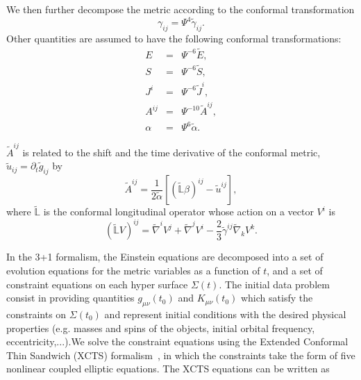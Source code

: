 \documentclass[aps,prd,amsmath,floatfix
,twocolumn
,superscriptaddress,nofootinbib,showpacs]{revtex4-1}
\theoremstyle{plain} \newtheorem{thm}{Theorem} \newtheorem{lem}{Lemma}
\begin{document}
We then further decompose the metric according to the conformal
transformation
\begin{equation}
\gamma_{ij} = \Psi^4\tilde{\gamma}_{ij}.
\end{equation}
Other quantities are assumed to have the following conformal
transformations:
\begin{eqnarray}
E &=& \Psi^{-6}\tilde{E}, \\ S &=& \Psi^{-6}\tilde{S}, \\ J^{i} &=&
\Psi^{-6}\tilde{J}^i, \\ A^{ij} &=& \Psi^{-10}\tilde{A}^{ij},\\ \alpha
&=& \Psi^{6}\tilde{\alpha}.
\end{eqnarray}

$\tilde{A}^{ij}$ is related to the shift and the time derivative of the conformal
metric, $\tilde{u}_{ij}=\partial_t\tilde{g}_{ij}$ by
\begin{equation}
\tilde{A}^{ij} =
\frac{1}{2\tilde{\alpha}}\left[\left(\tilde{\mathbb{L}}\beta\right)^{ij}-\tilde{u}^{ij}\right],
\end{equation}
where $\tilde{\mathbb{L}}$ is the conformal longitudinal operator whose action on a vector $V^i$ is
\begin{equation}
\left(\tilde{\mathbb{L}}V\right)^{ij} = \tilde{\nabla}^iV^j +
\tilde{\nabla}^jV^i -
\frac{2}{3}\tilde{\gamma}^{ij}\tilde{\nabla}_kV^k.
\end{equation}

In the 3+1 formalism, the Einstein equations are decomposed into a set
of evolution equations for the metric variables as a function of $t$,
and a set of constraint equations on each hyper surface
$\Sigma(t)$. The initial data problem consist in providing quantities
$g_{\mu \nu}(t_0)$ and $K_{\mu \nu}(t_0)$ which satisfy the
constraints on $\Sigma(t_0)$ and represent initial conditions with the
desired physical properties (e.g. masses and spins of the objects,
initial orbital frequency, eccentricity,...).We solve the constraint
equations using the Extended Conformal Thin Sandwich (XCTS)
formalism~\cite{York1999}, in which the constraints take the form of
five nonlinear coupled elliptic equations.  The XCTS equations can be
written as
\end{document}
